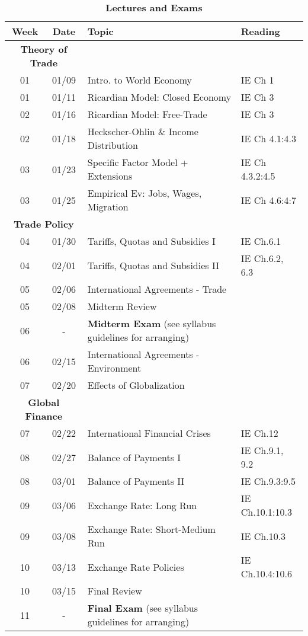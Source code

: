 \documentclass[10pt]{article}
\newcommand{\ra}[1]{\renewcommand{\arraystretch}{#1}}
\begin{document}
\begin{table}[h!]
	\caption*{\large\textbf{Lectures and Exams}}
	\centering
	\ra{1.5}
	\begin{tabular}{@{\extracolsep{0.5cm}} c c l l @{}}
		\toprule
		\textbf{Week} & \textbf{Date} & \textbf{Topic} & \textbf{Reading}  \\ \toprule
		 \multicolumn{2}{c}{\textbf{Theory of Trade}} & & \\
		01 & 01/09 & Intro. to World Economy & IE Ch 1 \\
		01 & 01/11 & Ricardian Model: Closed Economy & IE Ch 3 \\
		02 & 01/16 & Ricardian Model: Free-Trade & IE Ch 3 \\
		02 & 01/18 & Heckscher-Ohlin \& Income Distribution & IE Ch 4.1:4.3 \\
		03 & 01/23 & Specific Factor Model + Extensions & IE Ch 4.3.2:4.5  \\
		03 & 01/25 & Empirical Ev: Jobs, Wages, Migration  & IE Ch 4.6:4:7  \\ 
		\multicolumn{2}{c}{\textbf{Trade Policy}} & & \\
		04 & 01/30 & Tariffs, Quotas and Subsidies I & IE Ch.6.1\\ 
		04 & 02/01 & Tariffs, Quotas and Subsidies II & IE Ch.6.2, 6.3  \\
		05 & 02/06 & International Agreements - Trade &  \\
		05 & 02/08 & Midterm Review & \\ \midrule 
		06 & - & \textbf{Midterm Exam} (see syllabus guidelines for arranging) & \\ \midrule
		06 & 02/15 & International Agreements - Environment &   \\
		07 & 02/20 & Effects of Globalization  &   \\
		\multicolumn{2}{c}{\textbf{Global Finance}} & & \\
		07 & 02/22 & International Financial Crises &  IE Ch.12  \\ 
		08 & 02/27 & Balance of Payments I & IE Ch.9.1, 9.2  \\ 
		08 & 03/01 & Balance of Payments II & IE Ch.9.3:9.5 \\
		09 & 03/06 & Exchange Rate: Long Run & IE Ch.10.1:10.3  \\
		09 & 03/08 & Exchange Rate: Short-Medium Run & IE Ch.10.3   \\
		10 & 03/13 & Exchange Rate Policies & IE Ch.10.4:10.6 \\ 
		10 & 03/15 & Final Review &   \\  \midrule
		11 & - & \textbf{Final Exam} (see syllabus guidelines for arranging) & \\
		\bottomrule
	\end{tabular}
\end{table}
\end{document}
